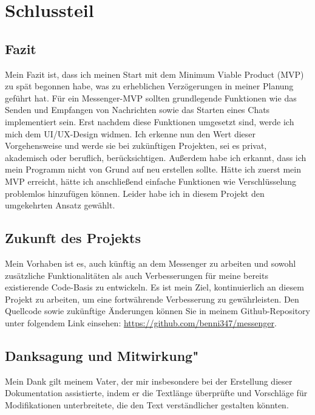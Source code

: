 \section{Schlussteil}
\subsection{Fazit}
Mein Fazit ist, dass ich meinen Start mit dem Minimum Viable Product (MVP) zu spät begonnen habe, was zu erheblichen Verzögerungen in meiner Planung geführt hat. Für ein Messenger-MVP sollten grundlegende Funktionen wie das Senden und Empfangen von Nachrichten sowie das Starten eines Chats implementiert sein. Erst nachdem diese Funktionen umgesetzt sind, werde ich mich dem UI/UX-Design widmen. Ich erkenne nun den Wert dieser Vorgehensweise und werde sie bei zukünftigen Projekten, sei es privat, akademisch oder beruflich, berücksichtigen. Außerdem habe ich erkannt, dass ich mein Programm nicht von Grund auf neu erstellen sollte. Hätte ich zuerst mein MVP erreicht, hätte ich anschließend einfache Funktionen wie Verschlüsselung problemlos hinzufügen können. Leider habe ich in diesem Projekt den umgekehrten Ansatz gewählt.
\subsection{Zukunft des Projekts}
Mein Vorhaben ist es, auch künftig an dem Messenger zu arbeiten und sowohl zusätzliche Funktionalitäten als auch Verbesserungen für meine bereits existierende Code-Basis zu entwickeln. Es ist mein Ziel, kontinuierlich an diesem Projekt zu arbeiten, um eine fortwährende Verbesserung zu gewährleisten. Den Quellcode sowie zukünftige Änderungen können Sie in meinem Github-Repository unter folgendem Link einsehen: \href{https://github.com/benni347/messenger}{https://github.com/benni347/messenger}.
\subsection{Danksagung und Mitwirkung"}
Mein Dank gilt meinem Vater, der mir insbesondere bei der Erstellung dieser Dokumentation assistierte, indem er die Textlänge überprüfte und Vorschläge für Modifikationen unterbreitete, die den Text verständlicher gestalten könnten.